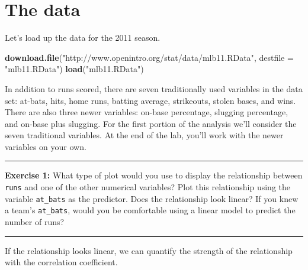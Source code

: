 \documentclass[]{book}
\newenvironment{Shaded}{\begin{snugshade}}{\end{snugshade}}
\newcommand{\DataTypeTok}[1]{\textcolor[rgb]{0.13,0.29,0.53}{#1}}
\newcommand{\KeywordTok}[1]{\textcolor[rgb]{0.13,0.29,0.53}{\textbf{#1}}}
\newcommand{\NormalTok}[1]{#1}
\newcommand{\OperatorTok}[1]{\textcolor[rgb]{0.81,0.36,0.00}{\textbf{#1}}}
\newcommand{\StringTok}[1]{\textcolor[rgb]{0.31,0.60,0.02}{#1}}
\theoremstyle{definition}
\theoremstyle{definition}
\theoremstyle{definition}
\theoremstyle{remark}
\begin{document}
\hypertarget{the-data-4}{%
\section{The data}\label{the-data-4}}

Let's load up the data for the 2011 season.

\begin{Shaded}
\begin{Highlighting}[]
\KeywordTok{download.file}\NormalTok{(}\StringTok{"http://www.openintro.org/stat/data/mlb11.RData"}\NormalTok{, }\DataTypeTok{destfile =} \StringTok{"mlb11.RData"}\NormalTok{)}
\KeywordTok{load}\NormalTok{(}\StringTok{"mlb11.RData"}\NormalTok{)}
\end{Highlighting}
\end{Shaded}

In addition to runs scored, there are seven traditionally used variables
in the data set: at-bats, hits, home runs, batting average, strikeouts,
stolen bases, and wins. There are also three newer variables: on-base
percentage, slugging percentage, and on-base plus slugging. For the
first portion of the analysis we'll consider the seven traditional
variables. At the end of the lab, you'll work with the newer variables
on your own.

\begin{center}\rule{0.5\linewidth}{\linethickness}\end{center}

\textbf{Exercise 1:} What type of plot would you use to display the
relationship between \texttt{runs} and one of the other numerical
variables? Plot this relationship using the variable \texttt{at\_bats}
as the predictor. Does the relationship look linear? If you knew a
team's \texttt{at\_bats}, would you be comfortable using a linear model
to predict the number of runs?

\begin{center}\rule{0.5\linewidth}{\linethickness}\end{center}

If the relationship looks linear, we can quantify the strength of the
relationship with the correlation coefficient.

\begin{Shaded}
\end{Shaded}
\end{document}

